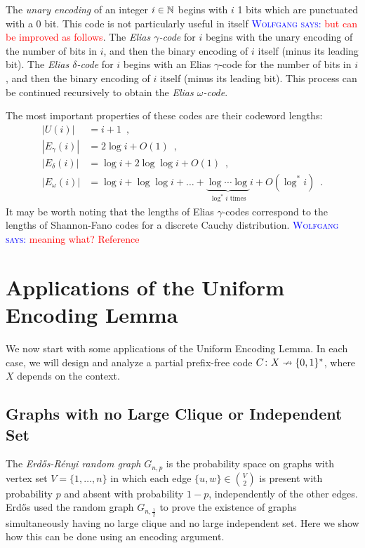 \documentclass{patmorin}
\newcommand{\aremark}[3]{\textcolor{blue}{\textsc{#1 #2:}}
  \textcolor{red}{\textsf{#3}}}
\newcommand{\wolfgang}[2][says]{\aremark{Wolfgang}{#1}{#2}}
\begin{document}
The \emph{unary encoding} of an integer $i \in \mathbb{N}$ begins with $i$ 1
bits which are punctuated with a 0 bit. This code is not particularly
useful in itself \wolfgang{but can be improved as follows}. 
The \emph{Elias $\gamma$-code} for $i$ begins with
the unary encoding of the number of bits in $i$, and then the binary
encoding of $i$ itself (minus its leading bit). The \emph{Elias
  $\delta$-code} for $i$ begins with an Elias $\gamma$-code for the
number of bits in $i$, and then the binary encoding of $i$ itself
(minus its leading bit). This process can be continued recursively to
obtain the \emph{Elias $\omega$-code}.

The most important properties of these codes are their codeword
lengths:
\begin{align*}
  |U(i)| &= i + 1 \enspace , \tag{Unary code} \\
  |E_\gamma(i)| &= 2 \log i + O(1) \enspace , \tag{Elias $\gamma$-code} \\
  |E_\delta(i)| &= \log i + 2 \log \log i + O(1) \enspace , \tag{Elias $\delta$-code} \\
  |E_\omega(i)| &= \log i + \log \log i + \dots + \underbrace{\log \cdots \log}_{\text{$\log^* i$ times}}i + O(\log^* i) \enspace . \tag{Elias $\omega$-code}
\end{align*}
It may be worth noting that the lengths of Elias $\gamma$-codes
correspond to the lengths of Shannon-Fano codes for a discrete Cauchy
distribution. \wolfgang{meaning what? Reference}

\section{Applications of the Uniform Encoding Lemma}

We now start with some applications of the Uniform Encoding Lemma. In
each case, we will design and analyze a partial prefix-free code
$C\colon X\nrightarrow \{0, 1\}^*$, where $X$ depends on
the context.

\subsection{Graphs with no Large Clique or Independent Set}

The \emph{Erd\H{o}s-R\'enyi random graph} $G_{n,p}$ is the
probability space on
graphs with vertex set $V=\{1,\ldots,n\}$ in which each edge $\{u,
w\} \in \binom{V}{2}$ is present with probability $p$ and absent with
probability $1-p$, independently of the other edges.  Erd\H{o}s
\cite{erdos:some} used the random graph $G_{n,\frac{1}{2}}$ to prove
the existence of graphs simultaneously having no large clique and no large
independent set. Here we show how this can be done using an encoding
argument.
\end{document}

